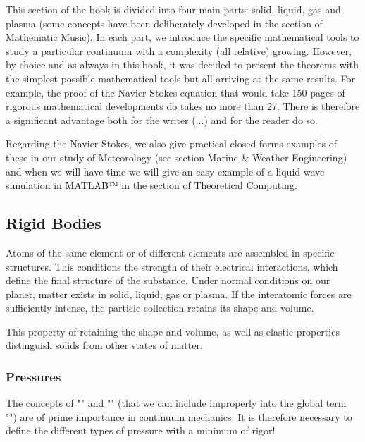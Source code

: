 	This section of the book is divided into four main parts: solid, liquid, gas and plasma (some concepts have been deliberately developed in the section of Mathematic Music). In each part, we introduce the specific mathematical tools to study a particular continuum with a complexity (all relative) growing. However, by choice and as always in this book, it was decided to present the theorems with the simplest possible mathematical tools but all arriving at the same results. For example, the proof of the Navier-Stokes equation that would take 150 pages of rigorous mathematical developments do takes no more than 27. There is therefore a significant advantage both for the writer (...) and for the reader do so.
	\begin{tcolorbox}[title=Remark,colframe=black,arc=10pt]
	Regarding the Navier-Stokes, we also give practical closed-forms examples of these in our study of Meteorology (see section Marine \& Weather Engineering) and when we will have time we will give an easy example of a liquid wave simulation in MATLAB™ in the section of Theoretical Computing.
	\end{tcolorbox}
	
	\subsection{Rigid Bodies}	
	Atoms of the same element or of different elements are assembled in specific structures. This conditions the strength of their electrical interactions, which define the final structure of the substance. Under normal conditions on our planet, matter exists in solid, liquid, gas or plasma. If the interatomic forces are sufficiently intense, the particle collection retains its shape and volume.
	
	This property of retaining the shape and volume, as well as elastic properties distinguish solids from other states of matter.
	
	\subsubsection{Pressures}
	The concepts of "" and "" (that we can include improperly into the global term "") are of prime importance in continuum mechanics. It is therefore necessary to define the different types of pressure with a minimum of rigor!
	
